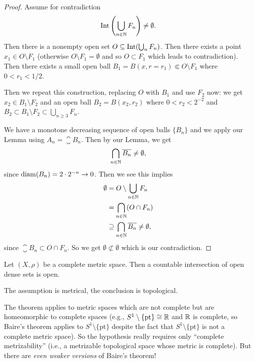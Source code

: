 \begin{proof}
Assume for contradiction
\begin{equation}
\operatorname{Int}\left(\bigcup_{n\in\mathbb{N}}F_{n}\right)\neq\emptyset.
\end{equation}
Then there is a nonempty open set $O\subseteq\operatorname{Int}(\bigcup_{n}F_{n})$.
Then there exists a point $x_{1}\in O\setminus F_{1}$ (otherwise
$O\setminus F_{1}=\emptyset$ and so $O\subset F_{1}$ which leads to
contradiction). Then there exists a small open ball
$B_{1}=B(x,r=r_{1})\Subset O\setminus F_{1}$ where $0<r_{1}<1/2$.

Then we repeat this construction, replacing $O$ with $B_{1}$ and use
$F_{2}$ now: we get $x_{2}\in B_{1}\setminus F_{2}$ and an open ball
$B_{2}=B(x_{2},r_{2})$ where $0<r_{2}<2^{-2}$ and
$B_{2}\subset B_{1}\setminus F_{2}\subset\bigcup_{n\geq3}F_{n}$.

We have a monotone decreasing sequence of open balls $\{B_{n}\}$ and
we apply our Lemma using $A_{n}=\closure{B_{n}}$. Then by our Lemma,
we get
\begin{equation}
\bigcap_{n\in\mathbb{N}}\overline{B_{n}}\neq\emptyset,
\end{equation}
since $\operatorname{diam}(B_{n})=2\cdot2^{-n}\to0$.
Then we see this implies
\begin{subequations}
  \begin{align}
\emptyset &= O\setminus\bigcup_{n\in\mathbb{N}}F_{n}\\
&=\bigcap_{n\in\mathbb{N}}(O\cap F_{n})\\
&\supseteq\bigcap_{n\in\mathbb{N}}\overline{B_{n}}\neq\emptyset,
  \end{align}
\end{subequations}
since $\closure{B_{n}}\subset O\cap F_{n}$. So we get
$\emptyset\not\subset\emptyset$ which is our contradiction.
\end{proof}

\begin{theorem}
Let $(X,\rho)$ be a complete metric space. Then a countable
intersection of open dense sets is open.
\end{theorem}

\begin{remark}
The assumption is metrical, the conclusion is topological.
\end{remark}

\begin{remark}
The theorem applies to metric spaces which are not complete but are
homeomorphic to complete spaces (e.g., $S^{1}\setminus\{\mbox{pt}\}\cong\mathbb{R}$
and $\mathbb{R}$ is complete, so Baire's theorem applies to
$S^{1}\setminus\{\mbox{pt}\}$ despite the fact that
$S^{1}\setminus\{\mbox{pt}\}$ is not a complete metric space). So the
hypothesis really requires only ``complete metrizability'' (i.e., a
metrizable topological space whose metric is complete). But there are
\emph{even weaker versions} of Baire's theorem!
\end{remark}

